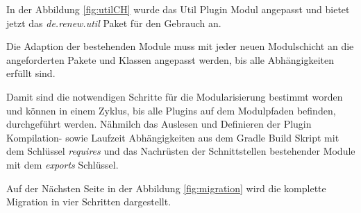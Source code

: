 	In der Abbildung \ref{fig:utilCH} wurde das Util Plugin Modul angepasst und bietet jetzt das \textit{de.renew.util}  Paket für den Gebrauch an. 
	\bigbreak

	Die Adaption der bestehenden Module muss mit jeder neuen Modulschicht an die angeforderten Pakete und Klassen angepasst werden, bis alle Abhängigkeiten erfüllt sind. 


	Damit sind die notwendigen Schritte für die Modularisierung bestimmt worden und können in einem Zyklus, bis alle Plugins auf dem Modulpfaden befinden, durchgeführt werden. Nähmilch das Auslesen und Definieren der Plugin Kompilation- sowie Laufzeit Abhängigkeiten aus dem Gradle Build Skript mit dem Schlüssel \textit{requires} und das Nachrüsten der Schnittstellen bestehender Module mit dem \textit{exports} Schlüssel. 
	\bigbreak

	Auf der Nächsten Seite in der Abbildung \ref{fig:migration} wird die komplette Migration in vier Schritten dargestellt.


